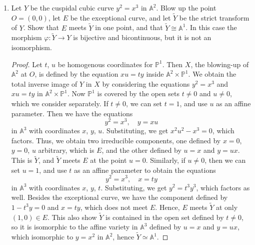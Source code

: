 \documentclass[12pt]{article}
\newcommand{\A}{\mathbb{A}}
\newcommand{\PP}{\mathbb{P}}
\theoremstyle{definition}
\begin{document}
\begin{enumerate} [label=\textbf{\arabic*.}, leftmargin=-0.05em]
\item Let $Y$ be the cuspidal cubic curve $y^2 = x^3$ in $\A^2$. Blow up the point $O = (0, 0)$, let $E$ be the exceptional curve, and let $\tilde{Y}$ be the strict transform of $Y$. Show that $E$ meets $\tilde{Y}$ in one point, and that $\tilde{Y} \cong \A^1$. In this case the morphism $\varphi : \tilde{Y} \to Y$ is bijective and bicontinuous, but it is not an isomorphism.

\begin{proof}
    Let $t$, $u$ be homogenous coordinates for $\PP^1$. Then $X$, the blowing-up of $\A^2$ at $O$, is defined by the equation $xu = ty$ inside $\A^2 \times \PP^1$. We obtain the total inverse image of $Y$ in $X$ by considering the equations $y^2 = x^3$ and $xu = ty$ in $\A^2 \times \PP^1$. Now $\PP^1$ is covered by the open sets $t \neq 0$ and $u \neq 0$, which we consider separately. If $t \neq 0$, we can set $t = 1$, and use $u$ as an affine parameter. Then we have the equations
    \begin{equation*}
        y^2 = x^3, \quad y = xu
    \end{equation*}
    in $\A^3$ with coordinates $x$, $y$, $u$. Substituting, we get $x^2u^2 - x^3 = 0$, which factors. Thus, we obtain two irreducible components, one defined by $x = 0$, $y = 0$, $u$ arbitrary, which is $E$, and the other defined by $u = x$ and $y = ux$. This is $\tilde{Y}$, and $\tilde{Y}$ meets $E$ at the point $u = 0$. Similarly, if $u \neq 0$, then we can set $u = 1$, and use $t$ as an affine parameter to obtain the equations
    \begin{equation*}
        y^2 = x^3, \quad x = ty
    \end{equation*}
    in $\A^3$ with coordinates $x$, $y$, $t$. Substituting, we get $y^2 = t^3 y^3$, which factors as well. Besides the exceptional curve, we have the component defined by $1 - t^3 y = 0$ and $x = ty$, which does not meet $E$. Hence, $E$ meets $\tilde{Y}$ at only $(1, 0) \in E$. This also show $\tilde{Y}$ is contained in the open set defined by $t \neq 0$, so it is isomorphic to the affine variety in $\A^3$ defined by $u = x$ and $y = ux$, which isomorphic to $y = x^2$ in $\A^2$, hence $\tilde{Y} \simeq \A^1$.
\end{proof}

\end{enumerate}
\end{document}
